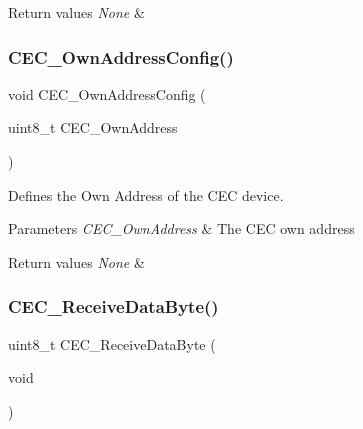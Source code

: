 \begin{DoxyRetVals}{Return values}
{\em None} & \\
\hline
\end{DoxyRetVals}
\mbox{\label{group___c_e_c___private___functions_gacad422ef1f50246b2021b41835b8a95c}} 
\subsubsection{\texorpdfstring{CEC\_OwnAddressConfig()}{CEC\_OwnAddressConfig()}}
{\footnotesize\ttfamily void C\+E\+C\+\_\+\+Own\+Address\+Config (\begin{DoxyParamCaption}\item[{uint8\+\_\+t}]{C\+E\+C\+\_\+\+Own\+Address }\end{DoxyParamCaption})}



Defines the Own Address of the C\+EC device. 


\begin{DoxyParams}{Parameters}
{\em C\+E\+C\+\_\+\+Own\+Address} & The C\+EC own address \\
\hline
\end{DoxyParams}

\begin{DoxyRetVals}{Return values}
{\em None} & \\
\hline
\end{DoxyRetVals}
\mbox{\label{group___c_e_c___private___functions_ga165837bff6292e7674eff6f8b230da97}} 
\subsubsection{\texorpdfstring{CEC\_ReceiveDataByte()}{CEC\_ReceiveDataByte()}}
{\footnotesize\ttfamily uint8\+\_\+t C\+E\+C\+\_\+\+Receive\+Data\+Byte (\begin{DoxyParamCaption}\item[{void}]{ }\end{DoxyParamCaption})}



